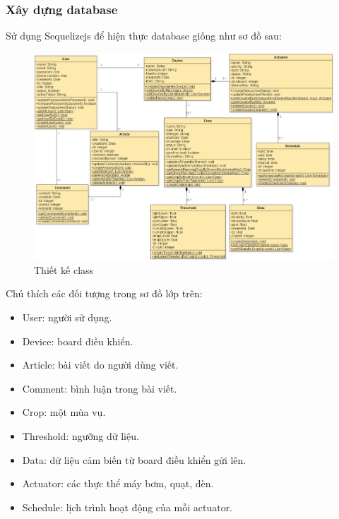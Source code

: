 \documentclass[a4paper,12pt,oneside]{article}
\begin{document}
\subsubsection{Xây dựng database}
\noindent Sử dụng Sequelizejs để hiện thực database giống như sơ đồ sau:
\begin{landscape}
\begin{center}
\begin{figure}[b]
\begin{center}
\includegraphics[scale=0.64]{hinh/class_diagram.jpg}
\end{center}
\caption{ Thiết kế class}
\end{figure}
\end{center}
\end{landscape}
\newpage
Chú thích các đối tượng trong sơ đồ lớp trên:
\begin{itemize}
\item User: người sử dụng.
\item Device: board điều khiển.
\item Article: bài viết do người dùng viết.
\item Comment: bình luận trong bài viết.
\item Crop: một mùa vụ.
\item Threshold: ngưỡng dữ liệu.
\item Data: dữ liệu cảm biến từ board điều khiển gửi lên.
\item Actuator: các thực thể máy bơm, quạt, đèn.
\item Schedule: lịch trình hoạt động của mỗi actuator.
\end{itemize}
\end{document}
